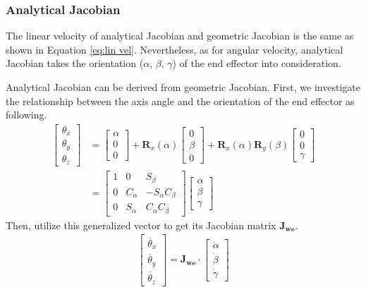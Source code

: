 \subsubsection{Analytical Jacobian}
\hspace*{6mm}The linear velocity of analytical Jacobian and geometric Jacobian is the same as shown in Equation \ref{eq:lin vel}. Nevertheless, as for angular velocity, analytical Jacobian takes the orientation ($\alpha$, $\beta$, $\gamma$) of the end effector into consideration. 
\par
Analytical Jacobian can be derived from geometric Jacobian. First, we investigate the relationship between the axis angle and the orientation of the end effector as following.
\begin{equation}
\begin{split}
\begin{bmatrix}
\theta _x \\ 
\theta _y \\ 
\theta _z
\end{bmatrix}
&=
\begin{bmatrix}
\alpha \\ 
0\\ 
0
\end{bmatrix}
+
\mathbf{R}_x(\alpha )
\begin{bmatrix}
0 \\ 
\beta \\ 
0
\end{bmatrix}
+
\mathbf{R}_x(\alpha )\mathbf{R}_y(\beta )
\begin{bmatrix}
0 \\ 
0\\ 
\gamma
\end{bmatrix}\\
&=
\begin{bmatrix}
1 & 0 & S_\beta \\ 
0 & C_\alpha & -S_\alpha C_\beta \\ 
0 & S_\alpha & C_\alpha C_\beta
\end{bmatrix}
\begin{bmatrix}
\alpha \\ 
\beta\\ 
\gamma
\end{bmatrix}
\end{split}
\end{equation}
Then, utilize this generalized vector to get its Jacobian matrix $\mathbf{J_{we}}$.
\begin{equation}
\begin{split}
\begin{bmatrix}
\dot{\theta _x} \\ 
\dot{\theta _y} \\ 
\dot{\theta _z}
\end{bmatrix}
=
\mathbf{J_{\!we}}
\cdot
\begin{bmatrix}
\dot{\alpha} \\ 
\dot{\beta} \\ 
\dot{\gamma}
\end{bmatrix}
\end{split}
\end{equation}
